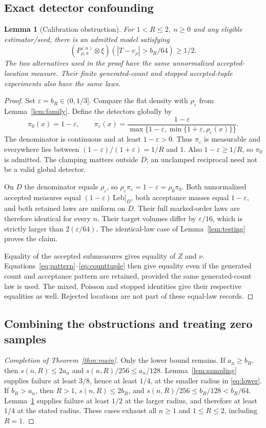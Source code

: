 \documentclass[11pt]{article}
\newtheorem{lemma}[theorem]{Lemma}
\theoremstyle{remark}
\begin{document}
\subsection{Exact detector confounding}
\begin{lemma}[Calibration obstruction]\label{lem:detector}
For $1<R\le2$, $n\ge0$ and any eligible estimator/seed, there is an
admitted model satisfying
\[
 (P_{\rho,\pi}^{(n)}\otimes\xi)(|T-v_\rho|>b_R/64)\ge1/2.
\]
The two alternatives used in the proof have the same unnormalized
accepted-location measure. Their finite generated-count and stopped
accepted-tuple experiments also have the same laws.
\end{lemma}
\begin{proof}
Set $\varepsilon=b_R\in(0,1/3]$. Compare the flat density with
$\rho_\varepsilon$ from Lemma~\ref{lem:family}. Define the detectors
globally by
\[
 \pi_0(x)=1-\varepsilon,\qquad
 \pi_\varepsilon(x)=
 \frac{1-\varepsilon}
 {\max\{1-\varepsilon,\min\{1+\varepsilon,\rho_\varepsilon(x)\}\}}.
\]
The denominator is continuous and at least $1-\varepsilon>0$. Thus
$\pi_\varepsilon$ is measurable and everywhere lies between
$(1-\varepsilon)/(1+\varepsilon)=1/R$ and $1$.
Also $1-\varepsilon\ge1/R$, so $\pi_0$ is admitted. The clamping
matters outside $D$; an unclamped reciprocal need not be a valid global
detector.

On $D$ the denominator equals $\rho_\varepsilon$, so
$\rho_\varepsilon\pi_\varepsilon=1-\varepsilon
=\rho_0\pi_0$. Both unnormalized accepted measures equal
$(1-\varepsilon)\,\mathrm{Leb}|_D$, both acceptance masses equal
$1-\varepsilon$, and both retained laws are uniform on $D$.
Their full marked-order laws are therefore identical for every $n$.
Their target volumes differ by $\varepsilon/16$, which is strictly
larger than $2(\varepsilon/64)$. The identical-law case of
Lemma~\ref{lem:testing} proves the claim.

Equality of the accepted submeasures gives equality of $Z$ and $\nu$.
Equations~\eqref{eq:pattern}--\eqref{eq:counttuple} then give equality
even if the generated count and acceptance pattern are retained, provided
the same generated-count law is used. The mixed, Poisson and stopped
identities give their respective equalities as well. Rejected locations
are not part of these equal-law records.
\end{proof}

\subsection{Combining the obstructions and treating zero samples}
\begin{proof}[Completion of Theorem~\ref{thm:main}]
Only the lower bound remains. If $a_n\ge b_R$, then
$s(n,R)\le2a_n$ and $s(n,R)/256\le a_n/128$.
Lemma~\ref{lem:sampling} supplies failure at least $3/8$, hence at
least $1/4$, at the smaller radius in \eqref{eq:lower}.
If $b_R>a_n$, then $R>1$, $s(n,R)\le2b_R$, and
$s(n,R)/256\le b_R/128<b_R/64$.
Lemma~\ref{lem:detector} supplies failure at least $1/2$ at the larger
radius, and therefore at least $1/4$ at the stated radius. These cases
exhaust all $n\ge1$ and $1\le R\le2$, including $R=1$.
\end{proof}
\end{document}
